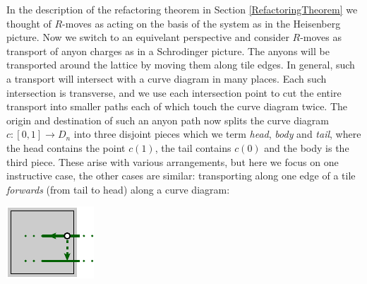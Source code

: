 In the description of the refactoring theorem
in Section \ref{RefactoringTheorem}
we thought of $R$-moves as acting on the basis of
the system as in the Heisenberg picture.
Now we switch to an equivelant perspective and
consider $R$-moves as transport of anyon charges
as in a Schrodinger picture.
The anyons will be transported around the lattice
by moving them along tile edges.
In general, such a transport will intersect with a
curve diagram in many places.
Each such intersection is transverse,
and we use each intersection point to cut
the entire transport into smaller paths each of
which touch the curve diagram twice.
The origin and destination of such an anyon path
now splits the curve diagram $c:[0, 1]\to D_n$ 
into three disjoint pieces which we term
\emph{head}, \emph{body} and \emph{tail}, where
the head contains the point $c(1)$, the tail
contains $c(0)$ and the body is the third piece.
These arise with various arrangements, but here
we focus on one instructive case, the
other cases are similar:
transporting along one edge of a tile \emph{forwards} 
(from tail to head) along a curve diagram:
\begin{center}
\includegraphics[]{pic-move-anyon.pdf}
\end{center}

